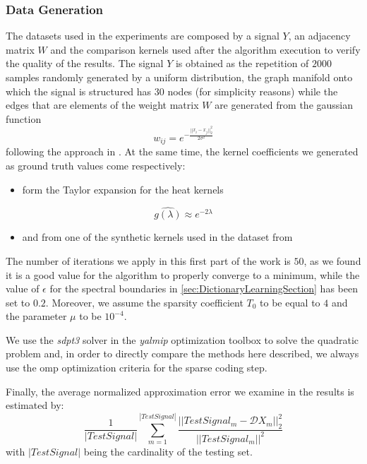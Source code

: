 \subsubsection{Data Generation}
The datasets used in the experiments are composed by a signal $Y$, an adjacency matrix $W$ and the comparison kernels used after the algorithm execution to verify the quality of the results. The signal $Y$ is obtained as the repetition of $2000$ samples randomly generated by a uniform distribution, the graph manifold onto which the signal is structured has $30$ nodes (for simplicity reasons) while the edges that are elements of the weight matrix $W$ are generated from the gaussian function
\begin{equation}
  w_{ij} = e^{-\frac{||x_i - x_j||_2^2}{2\sigma^2}}
\end{equation}
following the approach in \cite{Kalofolias2016}. At the same time, the kernel coefficients we generated as ground truth values come respectively:
\begin{itemize}
  \item form the Taylor expansion for the heat kernels
\end{itemize}
\begin{equation}
  \hat{g(\lambda)} \approx e^{-2\lambda}
\end{equation}
\begin{itemize}
  \item and from one of the synthetic kernels used in the dataset from \cite{Thanou2014}
\end{itemize}

The number of iterations we apply in this first part of the work is $50$, as we found it is a good value for the algorithm to properly converge to a minimum, while the value of $\epsilon$ for the spectral boundaries in \ref{sec:DictionaryLearningSection} has been set to $0.2$. Moreover, we assume the sparsity coefficient $T_0$ to be equal to $4$ and the parameter $\mu$ to be $10^{-4}$.

We use the \textit{sdpt3} solver in the \textit{yalmip} optimization toolbox to solve the quadratic problem and, in order to directly compare the methods here described, we always use the \gls{omp} optimization criteria for the sparse coding step.

Finally, the average normalized approximation error we examine in the results is estimated by:
\begin{equation}
  \frac{1}{|TestSignal|}\sum_{m=1}^{|TestSignal|}\frac{||TestSignal_m - \mathcal{D}X_m||_2^2}{||TestSignal_m||^2}
\end{equation}
with $|TestSignal|$ being the cardinality of the testing set.

